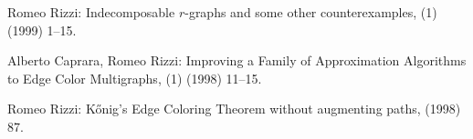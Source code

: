 \begin{etaremune}
  \item {\sc Romeo Rizzi:}
   \newblock  Indecomposable $r$-graphs and some other counterexamples,
   (1) (1999) 1--15.

  \item {\sc Alberto Caprara, Romeo Rizzi:}  
   \newblock  Improving a Family of Approximation
              Algorithms to Edge Color Multigraphs,
   (1) (1998) 11--15.

  \item {\sc Romeo Rizzi:}
   \newblock  K\H{o}nig's Edge Coloring Theorem without augmenting paths,
    (1998) 87.

\end{etaremune}
